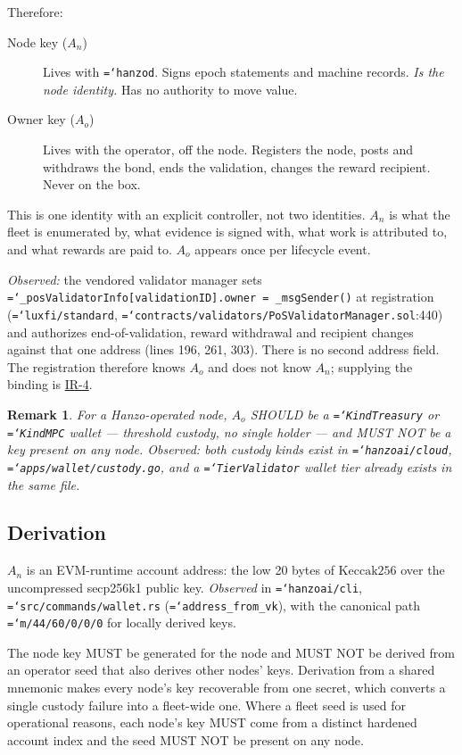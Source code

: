 \documentclass[11pt,a4paper]{article}
\newtheorem{remark}[definition]{Remark}
\newcommand{\code}[1]{\texttt{\hyphenchar\font=`\-\relax #1}}
\newcommand{\kec}{\mathrm{Keccak256}}
\begin{document}
Therefore:

\begin{description}
\item[Node key ($A_n$)] Lives with \code{hanzod}. Signs epoch statements and
  machine records. \emph{Is the node identity.} Has no authority to move value.
\item[Owner key ($A_o$)] Lives with the operator, off the node. Registers the
  node, posts and withdraws the bond, ends the validation, changes the reward
  recipient. Never on the box.
\end{description}

This is one identity with an explicit controller, not two identities. $A_n$ is
what the fleet is enumerated by, what evidence is signed with, what work is
attributed to, and what rewards are paid to. $A_o$ appears once per lifecycle
event.

\emph{Observed:} the vendored validator manager sets
\code{\_posValidatorInfo[validationID].owner = \_msgSender()} at registration
(\code{luxfi/standard}, \code{contracts/validators/PoSValidatorManager.sol}:440)
and authorizes end-of-validation, reward withdrawal and recipient changes against
that one address (lines 196, 261, 303). There is no second address field. The
registration therefore knows $A_o$ and does not know $A_n$; supplying the binding
is \hyperref[sec:req]{IR-4}.

\begin{remark}
For a Hanzo-operated node, $A_o$ SHOULD be a \code{KindTreasury} or \code{KindMPC}
wallet --- threshold custody, no single holder --- and MUST NOT be a key present
on any node. \emph{Observed:} both custody kinds exist in \code{hanzoai/cloud},
\code{apps/wallet/custody.go}, and a \code{TierValidator} wallet tier already
exists in the same file.
\end{remark}

\subsection{Derivation}

$A_n$ is an EVM-runtime account address: the low 20 bytes of $\kec$ over the
uncompressed secp256k1 public key. \emph{Observed} in \code{hanzoai/cli},
\code{src/commands/wallet.rs} (\code{address\_from\_vk}), with the canonical path
\code{m/44\textquotesingle/60\textquotesingle/0\textquotesingle/0/0} for locally
derived keys.

The node key MUST be generated for the node and MUST NOT be derived from an
operator seed that also derives other nodes' keys. Derivation from a shared
mnemonic makes every node's key recoverable from one secret, which converts a
single custody failure into a fleet-wide one. Where a fleet seed is used for
operational reasons, each node's key MUST come from a distinct hardened account
index and the seed MUST NOT be present on any node.
\end{document}
